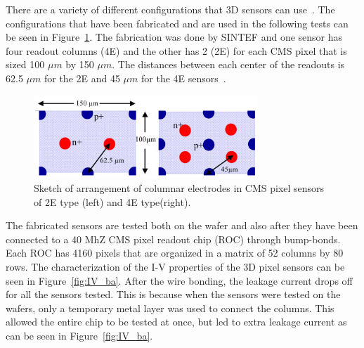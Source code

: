There are a variety of different configurations that 3D sensors can use~\cite{3dsilicon}.  The configurations that have been fabricated and are used in the following tests can be seen in Figure~\ref{fig:configuration_3d}. The fabrication was done by SINTEF and one sensor has four readout columns (4E) and the other has 2 (2E) for each CMS pixel that is sized 100 $\mu m$ by 150 $\mu m$.  The distances between each center of the readouts is 62.5 $\mu m$ for the 2E and 45 $\mu m$ for the 4E sensors~\cite{5556029}.


\begin{figure}[htb!]
\begin{center}
\centerline{
\includegraphics[width=0.75\textwidth]{3D/configuration.pdf}
}
\caption{Sketch of arrangement of columnar electrodes in CMS pixel sensors of
2E type (left) and 4E type(right).~\cite{5734879} }
\label{fig:configuration_3d}
\end{center}
\end{figure}

The fabricated sensors are tested both on the wafer and also after they have been connected to a 40 MhZ CMS pixel readout chip (ROC) through bump-bonds.  Each ROC has 4160 pixels that are organized in a matrix of 52 columns by 80 rows. The characterization of the I-V properties of the 3D pixel sensors can be seen in Figure~\ref{fig:IV_ba}. After the wire bonding, the leakage current drops off for all the sensors tested.  This is because when the sensors were tested on the wafers, only a temporary metal layer was used to connect the columns.  This allowed the entire chip to be tested at once, but led to extra leakage current as can be seen in Figure~\ref{fig:IV_ba}.

